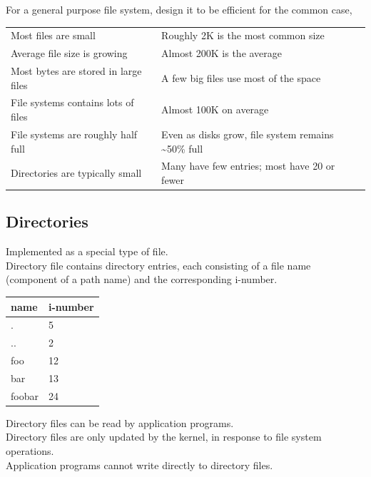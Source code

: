 \documentclass[12pt]{article}
\theoremstyle{plain}
\theoremstyle{definition}
\begin{document}
For a general purpose file system, design it to be efficient for the common case,
\begin{table}[H]
  \centering
  \begin{tabular}{l|l}
  Most files are small & Roughly 2K is the most common size \\
  Average file size is growing & Almost 200K is the average \\
  Most bytes are stored in large files & A few big files use most of the space \\
  File systems contains lots of files & Almost 100K on average \\
  File systems are roughly half full & Even as disks grow, file system remains \textasciitilde50\% full \\
  Directories are typically small & Many have few entries; most have 20 or fewer
  \end{tabular}
\end{table}

\subsection{Directories}
Implemented as a special type of file. \\
Directory file contains directory entries, each consisting of a file name (component of a path name) and the corresponding i-number.
\begin{table}[H]
  \centering
  \begin{tabular}{l|l}
  name & i-number \\ \hline
  . & 5 \\
  .. & 2 \\
  foo & 12 \\
  bar & 13 \\
  foobar & 24
  \end{tabular}
\end{table}

Directory files can be read by application programs. \\
Directory files are only updated by the kernel, in response to file system operations. \\
Application programs cannot write directly to directory files.
\end{document}

